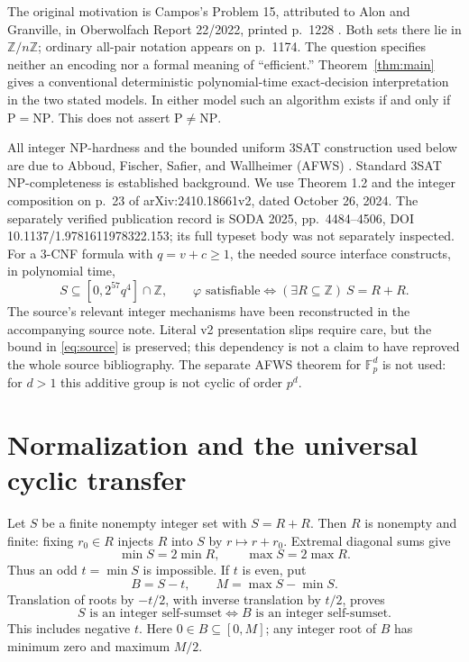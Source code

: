 \documentclass[11pt]{article}
\newcommand{\Z}{\mathbb Z}
\newcommand{\NP}{\mathrm{NP}}
\newcommand{\PP}{\mathrm P}
\begin{document}
The original motivation is Campos's Problem 15, attributed to Alon and Granville, in Oberwolfach Report 22/2022, printed p.~1228 \cite{owr}. Both sets there lie in $\Z/n\Z$; ordinary all-pair notation appears on p.~1174. The question specifies neither an encoding nor a formal meaning of ``efficient.'' Theorem~\ref{thm:main} gives a conventional deterministic polynomial-time exact-decision interpretation in the two stated models. In either model such an algorithm exists if and only if $\PP=\NP$. This does not assert $\PP\ne\NP$.

All integer NP-hardness and the bounded uniform 3SAT construction used below are due to Abboud, Fischer, Safier, and Wallheimer (AFWS) \cite{afws}. Standard 3SAT NP-completeness is established background. We use Theorem 1.2 and the integer composition on p.~23 of arXiv:2410.18661v2, dated October 26, 2024. The separately verified publication record is SODA 2025, pp.~4484--4506, DOI 10.1137/1.9781611978322.153; its full typeset body was not separately inspected. For a 3-CNF formula with $q=v+c\geq1$, the needed source interface constructs, in polynomial time,
\begin{equation}\label{eq:source}
 S\subseteq [0,2^{57}q^4]\cap\Z,
 \qquad \varphi\text{ satisfiable}\iff (\exists R\subseteq\Z)\ S=R+R.
\end{equation}
The source's relevant integer mechanisms have been reconstructed in the accompanying source note. Literal v2 presentation slips require care, but the bound in \eqref{eq:source} is preserved; this dependency is not a claim to have reproved the whole source bibliography. The separate AFWS theorem for $\mathbb F_p^d$ is not used: for $d>1$ this additive group is not cyclic of order $p^d$.

\section{Normalization and the universal cyclic transfer}
Let $S$ be a finite nonempty integer set with $S=R+R$. Then $R$ is nonempty and finite: fixing $r_0\in R$ injects $R$ into $S$ by $r\mapsto r+r_0$. Extremal diagonal sums give
\[
 \min S=2\min R,\qquad \max S=2\max R.
\]
Thus an odd $t=\min S$ is impossible. If $t$ is even, put
\[
 B=S-t,\qquad M=\max S-\min S.
\]
Translation of roots by $-t/2$, with inverse translation by $t/2$, proves
\begin{equation}\label{eq:normal}
 S\text{ is an integer self-sumset}\iff B\text{ is an integer self-sumset}.
\end{equation}
This includes negative $t$. Here $0\in B\subseteq[0,M]$; any integer root of $B$ has minimum zero and maximum $M/2$.
\end{document}
